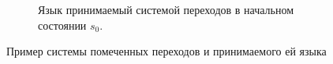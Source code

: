 \begin{figure}[t]
\begin{subfigure}[t]{0.48\textwidth}

    \caption{Язык принимаемый системой переходов в начальном состоянии $s_0$.}
    \label{fig:lang-ex}
    \end{subfigure}

  \label{fig:lts-lang-ex}
  \caption{
    Пример системы помеченных переходов и принимаемого ей языка
  }
\end{figure}
